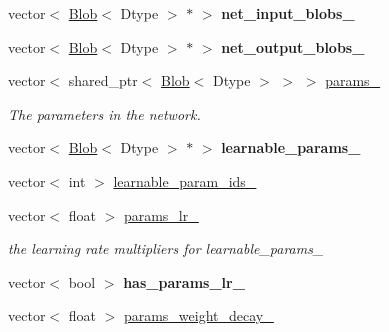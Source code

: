 \begin{DoxyCompactItemize}
\item 
vector$<$ \hyperlink{classcaffe_1_1Blob}{Blob}$<$ Dtype $>$ $\ast$ $>$ {\bfseries net\+\_\+input\+\_\+blobs\+\_\+}\hypertarget{classcaffe_1_1Net_aeed682088cd2252f8402cb7b169d4f39}{}\label{classcaffe_1_1Net_aeed682088cd2252f8402cb7b169d4f39}

\item 
vector$<$ \hyperlink{classcaffe_1_1Blob}{Blob}$<$ Dtype $>$ $\ast$ $>$ {\bfseries net\+\_\+output\+\_\+blobs\+\_\+}\hypertarget{classcaffe_1_1Net_abbcd68a31a7ddc67dcac789fe880da23}{}\label{classcaffe_1_1Net_abbcd68a31a7ddc67dcac789fe880da23}

\item 
vector$<$ shared\+\_\+ptr$<$ \hyperlink{classcaffe_1_1Blob}{Blob}$<$ Dtype $>$ $>$ $>$ \hyperlink{classcaffe_1_1Net_accf52332675952dd27dfc8d3c27fa583}{params\+\_\+}\hypertarget{classcaffe_1_1Net_accf52332675952dd27dfc8d3c27fa583}{}\label{classcaffe_1_1Net_accf52332675952dd27dfc8d3c27fa583}

\begin{DoxyCompactList}\small\item\em The parameters in the network. \end{DoxyCompactList}\item 
vector$<$ \hyperlink{classcaffe_1_1Blob}{Blob}$<$ Dtype $>$ $\ast$ $>$ {\bfseries learnable\+\_\+params\+\_\+}\hypertarget{classcaffe_1_1Net_a8459836322f01d0774b199f39bf24aaa}{}\label{classcaffe_1_1Net_a8459836322f01d0774b199f39bf24aaa}

\item 
vector$<$ int $>$ \hyperlink{classcaffe_1_1Net_adf8dfb59e46d62c9333f322cea631bd8}{learnable\+\_\+param\+\_\+ids\+\_\+}
\item 
vector$<$ float $>$ \hyperlink{classcaffe_1_1Net_aeb1f85c97372f57336e4e1af3eb7b9db}{params\+\_\+lr\+\_\+}\hypertarget{classcaffe_1_1Net_aeb1f85c97372f57336e4e1af3eb7b9db}{}\label{classcaffe_1_1Net_aeb1f85c97372f57336e4e1af3eb7b9db}

\begin{DoxyCompactList}\small\item\em the learning rate multipliers for learnable\+\_\+params\+\_\+ \end{DoxyCompactList}\item 
vector$<$ bool $>$ {\bfseries has\+\_\+params\+\_\+lr\+\_\+}\hypertarget{classcaffe_1_1Net_ace00e003ea4ff0512f67b607294fd0cf}{}\label{classcaffe_1_1Net_ace00e003ea4ff0512f67b607294fd0cf}

\item 
vector$<$ float $>$ \hyperlink{classcaffe_1_1Net_ad337cf5b16e69533f605dbe1f6932bc9}{params\+\_\+weight\+\_\+decay\+\_\+}\hypertarget{classcaffe_1_1Net_ad337cf5b16e69533f605dbe1f6932bc9}{}\label{classcaffe_1_1Net_ad337cf5b16e69533f605dbe1f6932bc9}


\end{DoxyCompactItemize}
